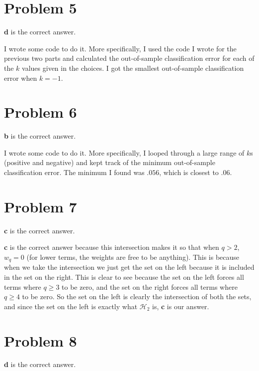\documentclass{article}
\begin{document}
\section*{Problem 5}
\textbf{d} is the correct answer.

\noindent I wrote some code to do it. More specifically, I used the code
I wrote for the previous two parts and calculated the out-of-sample
classification error for each of the $k$ values given in the choices. I got
the smallest out-of-sample classification error when $k = -1$.

\section*{Problem 6}
\textbf{b} is the correct answer.

\noindent I wrote some code to do it. More specifically, I looped through
a large range of $k$s (positive and negative) and kept track of the minimum
out-of-sample classification error. The minimum I found was $.056$, which is
closest to $.06$.

\section*{Problem 7}
\textbf{c} is the correct answer.

\noindent \textbf{c} is the correct answer because this intersection makes
it so that when $q > 2$, $w_q = 0$ (for lower terms, the weights are free to
be anything). This is because when we take the intersection
we just get the set on the left because it is included in the set on the right.
This is clear to see because the set on the left forces all terms where
$q \geq 3$ to be zero, and the set on the right forces all terms where
$q \geq 4$ to be zero. So the set on the left is clearly the intersection of
both the sets, and since the set on the left is exactly what $\mathcal{H}_2$ is,
\textbf{c} is our answer.

\section*{Problem 8}
\textbf{d} is the correct answer.
\end{document}
